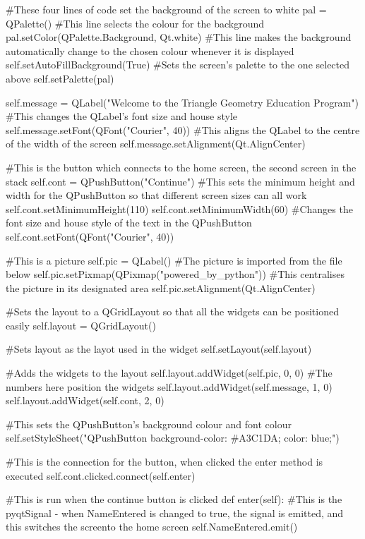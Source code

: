 \begin{landscape}
\begin{python}
        #These four lines of code set the background of the screen to white
        pal = QPalette()
        #This line selects the colour for the background
        pal.setColor(QPalette.Background, Qt.white)
        #This line makes the background automatically change to the chosen colour whenever it is displayed
        self.setAutoFillBackground(True)
        #Sets the screen's palette to the one selected above
        self.setPalette(pal)

        self.message = QLabel("Welcome to the Triangle Geometry Education Program")
        #This changes the QLabel's font size and house style
        self.message.setFont(QFont("Courier", 40))
        #This aligns the QLabel to the centre of the width of the screen
        self.message.setAlignment(Qt.AlignCenter)

        #This is the button which connects to the home screen, the second screen in the stack
        self.cont = QPushButton("Continue")
        #This sets the minimum height and width for the QPushButton so that different screen sizes can all work
        self.cont.setMinimumHeight(110)
        self.cont.setMinimumWidth(60)
        #Changes the font size and house style of the text in the QPushButton
        self.cont.setFont(QFont("Courier", 40))

        #This is a picture
        self.pic = QLabel()
        #The picture is imported from the file below
        self.pic.setPixmap(QPixmap("powered_by_python"))
        #This centralises the picture in its designated area
        self.pic.setAlignment(Qt.AlignCenter)

        #Sets the layout to a QGridLayout so that all the widgets can be positioned easily
        self.layout = QGridLayout()

        #Sets layout as the layot used in the widget
        self.setLayout(self.layout)

        #Adds the widgets to the layout 
        self.layout.addWidget(self.pic, 0, 0) #The numbers here position the widgets
        self.layout.addWidget(self.message, 1, 0)
        self.layout.addWidget(self.cont, 2, 0)

        #This sets the QPushButton's background colour and font colour
        self.setStyleSheet("QPushButton {background-color: #A3C1DA; color: blue;}")

        #This is the connection for the button, when clicked the enter method is executed
        self.cont.clicked.connect(self.enter)

    #This is run when the continue button is clicked
    def enter(self):
        #This is the pyqtSignal - when NameEntered is changed to true, the signal is emitted, and this switches the screento the home screen
        self.NameEntered.emit()
\end{python}


\end{landscape}
